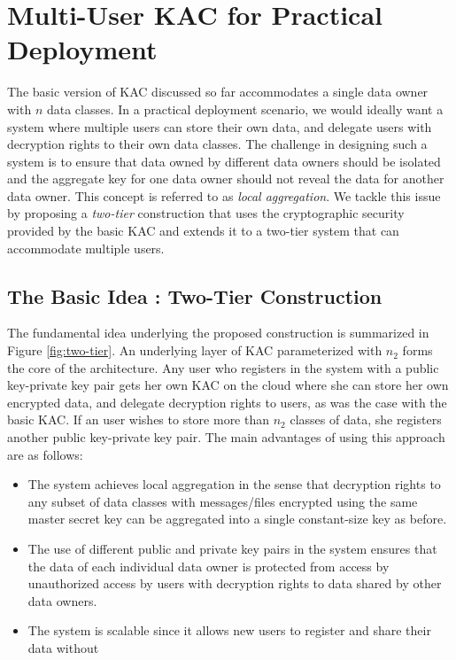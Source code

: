 \section{Multi-User KAC for Practical Deployment}
\label{sec:general}

The basic version of KAC discussed so far accommodates a single data owner with $n$ data classes. In a practical deployment scenario, we would ideally want a system where multiple users can store their own data, and delegate users with decryption rights to their own data classes. The challenge in designing such a system is to ensure that data owned by different data owners should be isolated and the aggregate key for one data owner should not reveal the data for another data owner. This concept is referred to as \emph{local aggregation}. We tackle this issue by proposing a \emph{two-tier} construction that uses the cryptographic security provided by the basic KAC and extends it to a two-tier system that can accommodate multiple users. 

\subsection{The Basic Idea : Two-Tier Construction}
\label{subsec:two-tier}

The fundamental idea underlying the proposed construction is summarized in Figure \ref{fig:two-tier}. An underlying layer of KAC parameterized with $n_2$ forms the core of the architecture. Any user who registers in the system with a public key-private key pair gets her own KAC on the cloud where she can store her own encrypted data, and delegate decryption rights to users, as was the case with the basic KAC. If an user wishes to store more than $n_2$ classes of data, she registers another public key-private key pair. The main advantages of using this approach are as follows:

\begin{itemize}
 \item The system achieves local aggregation in the sense that decryption rights to any subset of data classes with messages/files encrypted using the same master secret key can be aggregated into a single constant-size key as before.
  
 \item The use of different public and private key pairs in the system ensures that the data of each individual data owner is protected from access by unauthorized access by users with decryption rights to data shared by other data owners.
 
 \item The system is scalable since it allows new users to register and share their data without  
\end{itemize}


